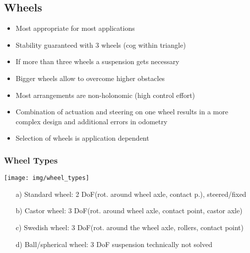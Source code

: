 \documentclass[fontsize=6pt]{scrartcl}
\begin{document}
\begin{multicols*}{4}

\subsection*{Wheels}
\begin{itemize}
	\item Most appropriate for most applications
	\item Stability guaranteed with 3 wheels (cog within triangle)
	\item If more than three wheels a suspension gets necessary
	\item Bigger wheels allow to overcome higher obstacles
	\item Most arrangements are non-holonomic (high control effort)
	\item Combination of actuation and steering on one wheel results in a more complex design and additional errors in odometry
	\item Selection of wheels is application dependent
\end{itemize}

\subsubsection*{Wheel Types}

{\centering
	\texttt{[image: img/wheel\_types]}
\par}

\begin{enumerate}
	\item[a)] Standard wheel: 2 DoF(rot. around wheel axle, contact p.), steered/fixed
	\item[b)] Castor wheel: 3 DoF(rot. around wheel axle, contact point, castor axle)
	\item[c)] Swedish wheel: 3 DoF(rot. around the wheel axle, rollers, contact point)
	\item[d)] Ball/spherical wheel:	3 DoF suspension technically not solved
\end{enumerate}


\end{multicols*}
\end{document}
